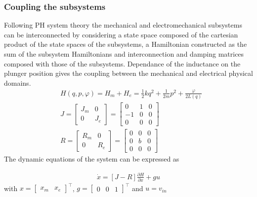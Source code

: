 \documentclass[letterpaper, 10pt, conference]{ieeeconf}
\begin{document}
\subsubsection{Coupling the subsystems}
Following PH system theory the mechanical and electromechanical subsystems can be interconnected by considering a state space composed of the cartesian product of the state spaces of the subsystems, a Hamiltonian constructed as the sum of the subsystem Hamiltonians and interconnection and damping matrices composed with those of the subsystems. Dependance of the inductance on the plunger position gives the coupling between the mechanical and electrical physical domains.
\begin{align}
    &H(q,p,\varphi) = H_m + H_e = \frac{1}{2}kq^2 + \frac{1}{2m} p^2 + \frac{\varphi}{2 L(q)}\\
    &J = \begin{bmatrix}
        J_m & 0 \\ 0 & J_e
    \end{bmatrix}  = \begin{bmatrix}
        0 & 1 & 0 \\ 
        -1 & 0 & 0 \\
        0 & 0 & 0
    \end{bmatrix}\\
    &R = \begin{bmatrix}
        R_m & 0 \\ 0 & R_e
    \end{bmatrix} = \begin{bmatrix}
        0 & 0 & 0 \\
        0 & b & 0\\
        0 & 0 & 0
    \end{bmatrix}
\end{align}
The dynamic equations of the system can be expressed as

\begin{align}
    \dot{x} = [J-R]\frac{\partial H}{\partial x} + gu
\end{align}\label{eq:plunger_original_PCH}
with $x = \begin{bmatrix}
    x_m & x_e
\end{bmatrix}^\top$, $g=\begin{bmatrix}
    0 & 0 & 1
\end{bmatrix}^\top$ and $u=v_{in}$
\end{document}
